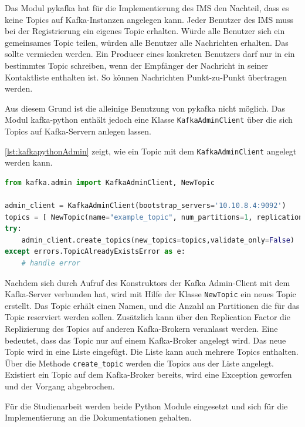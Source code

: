 \documentclass[a4paper,titlepage,halfparskip,12pt]{scrreprt}
\begin{document}
\begin{onehalfspacing}
Das Modul pykafka hat für die Implementierung des \acs{IMS} den Nachteil, dass es keine Topics auf Kafka-Instanzen angelegen kann. Jeder Benutzer des \acs{IMS} muss bei der Registrierung ein eigenes Topic erhalten. Würde alle Benutzer sich ein gemeinsames Topic teilen, würden alle Benutzer alle Nachrichten erhalten. Das sollte vermieden werden. Ein Producer eines konkreten Benutzers darf nur in ein bestimmtes Topic schreiben, wenn der Empfänger der Nachricht in seiner Kontaktliste enthalten ist. So können Nachrichten Punkt-zu-Punkt übertragen werden.

Aus diesem Grund ist die alleinige Benutzung von pykafka nicht möglich. Das Modul kafka-python enthält jedoch eine Klasse \texttt{KafkaAdminClient} über die sich Topics auf Kafka-Servern anlegen lassen. 

\pagebreak

\autoref{lst:kafkapythonAdmin} zeigt, wie ein Topic mit dem \texttt{KafkaAdminClient} angelegt werden kann.

\begin{lstlisting}[language=python, caption={Beispiel: Anlegen eines Topics mit dem KafkaAdminClient des Moduls kafka-python}, label={lst:kafkapythonAdmin}]
from kafka.admin import KafkaAdminClient, NewTopic

admin_client = KafkaAdminClient(bootstrap_servers='10.10.8.4:9092')
topics = [ NewTopic(name="example_topic", num_partitions=1, replication_factor=1) ]
try:
    admin_client.create_topics(new_topics=topics,validate_only=False)
except errors.TopicAlreadyExistsError as e:
    # handle error

\end{lstlisting}

Nachdem sich durch Aufruf des Konstruktors der Kafka Admin-Client mit dem Kafka-Server verbunden hat, wird mit Hilfe der Klasse \texttt{NewTopic} ein neues Topic erstellt. Das Topic erhält einen Namen, und die Anzahl an Partitionen die für das Topic reserviert werden sollen. Zusätzlich kann über den Replication Factor die Replizierung des Topics auf anderen Kafka-Brokern veranlasst werden. Eine \grqq bedeutet, dass das Topic nur auf einem Kafka-Broker angelegt wird. Das neue Topic wird in eine Liste eingefügt. Die Liste kann auch mehrere Topics enthalten. Über die Methode \texttt{create\_topic} werden die Topics aus der Liste angelegt. Existiert ein Topic auf dem Kafka-Broker bereits, wird eine Exception geworfen und der Vorgang abgebrochen.

Für die Studienarbeit werden beide Python Module eingesetzt und sich für die Implementierung an die Dokumentationen \cite{pykafkaDocumentation, pythonKafka} gehalten.


\end{onehalfspacing}
\end{document}
